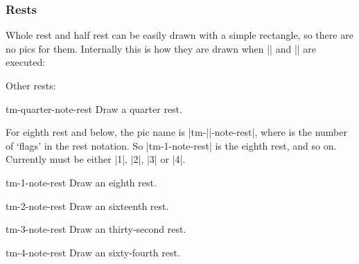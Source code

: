 \subsubsection{Rests}\label{sec:out:pic:rests}
Whole rest and half rest can be easily drawn with a simple rectangle, so there 
are no pics for them. Internally this is how they are drawn when |\tmwholerest| 
and |\tmhalfrest| are executed:
\begin{codeexample}[]
\end{codeexample}
Other rests:
\begin{pictype}{tm-quarter-note-rest}{}
  Draw a quarter rest.
\end{pictype}
\begin{codeexample}[]
\end{codeexample}
For eighth rest and below, the pic name is |tm-||-note-rest|, where 
 is the number of `flags' in the rest notation. So |tm-1-note-rest| 
is the eighth rest, and so on. Currently  must be either |1|,
|2|, |3| or |4|.
\begin{pictype}{tm-1-note-rest}{}
  Draw an eighth rest.
\end{pictype}
\begin{pictype}{tm-2-note-rest}{}
  Draw an sixteenth rest.
\end{pictype}
\begin{pictype}{tm-3-note-rest}{}
  Draw an thirty-second rest.
\end{pictype}
\begin{pictype}{tm-4-note-rest}{}
  Draw an sixty-fourth rest.
\end{pictype}
\begin{codeexample}[width=5.5cm]
\end{codeexample}

